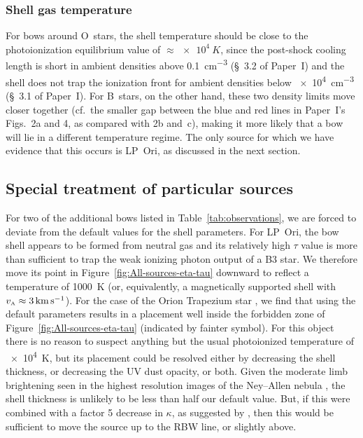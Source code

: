 \subsubsection{Shell gas temperature}
\label{sec:shell-gas-temp}
For bows around O~stars, the shell temperature should be close to the
photoionization equilibrium value of \(\approx \SI{e4}{K}\), since the
post-shock cooling length is short in ambient densities above
\SI{0.1}{cm^{-3}} (\S~3.2 of Paper~I)
and the shell does not trap the ionization front for ambient densities
below \SI{e4}{cm^{-3}} (\S~3.1 of Paper~I).
For B~stars, on the other hand, these two density limits move closer
together (cf.~the smaller gap between the blue and red lines in
Paper~I's Figs.~2a and 4, as compared with 2b and~c), making it more
likely that a bow will lie in a different temperature regime.  The
only source for which we have evidence that this occurs is LP~Ori, as
discussed in the next section.

\subsection{Special treatment of particular sources}
\label{sec:spec-treatm-part}

For two of the additional bows listed in Table~\ref{tab:observations},
we are forced to deviate from the default values for the shell
parameters.  For LP~Ori, the bow shell appears to be formed from
neutral gas \citep{ODell:2001c} and its relatively high \(\tau\) value
is more than sufficient to trap the weak ionizing photon output of a
B3 star.  We therefore move its point in
Figure~\ref{fig:All-sources-eta-tau} downward to reflect a temperature
of \SI{1000}{K} (or, equivalently, a magnetically supported shell with
\(v_{\scriptscriptstyle\text{A}} \approx \SI{3}{km.s^{-1}}\)).  For the case of the Orion
Trapezium star \thD{}, we find that using the default parameters
results in a placement well inside the forbidden zone of
Figure~\ref{fig:All-sources-eta-tau} (indicated by fainter symbol).
For this object there is no reason to suspect anything but the usual
photoionized temperature of \SI{e4}{K}, but its placement could be
resolved either by decreasing the shell thickness, or decreasing the
UV dust opacity, or both. Given the moderate limb brightening seen in
the highest resolution images of the Ney--Allen nebula
\citep{Robberto:2005a, Smith:2005a}, the shell thickness is unlikely
to be less than half our default value.  But, if this were combined
with a factor 5 decrease in \(\kappa\), as suggested by
\citet{Salgado:2016a}, then this would be sufficient to move the
source up to the RBW line, or slightly above.


